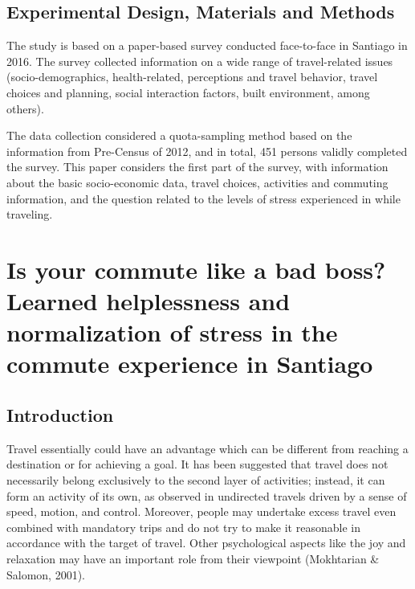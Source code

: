 \documentclass[
11pt, %
oneside, %
english, %
singlespacing, %
]{macthesis} %
\begin{document}
\hypertarget{experimental-design-materials-and-methods}{%
\section{Experimental Design, Materials and Methods}\label{experimental-design-materials-and-methods}}

The study is based on a paper-based survey conducted face-to-face in Santiago in 2016. The survey collected information on a wide range of travel-related issues (socio-demographics, health-related, perceptions and travel behavior, travel choices and planning, social interaction factors, built environment, among others).

The data collection considered a quota-sampling method based on the information from Pre-Census of 2012, and in total, 451 persons validly completed the survey. This paper considers the first part of the survey, with information about the basic socio-economic data, travel choices, activities and commuting information, and the question related to the levels of stress experienced in while traveling.

\hypertarget{is-your-commute-like-a-bad-boss-learned-helplessness-and-normalization-of-stress-in-the-commute-experience-in-santiago}{%
\chapter{Is your commute like a bad boss? Learned helplessness and normalization of stress in the commute experience in Santiago}\label{is-your-commute-like-a-bad-boss-learned-helplessness-and-normalization-of-stress-in-the-commute-experience-in-santiago}}

\hypertarget{introduction-3}{%
\section{Introduction}\label{introduction-3}}

Travel essentially could have an advantage which can be different from reaching a destination or for achieving a goal. It has been suggested that travel does not necessarily belong exclusively to the second layer of activities; instead, it can form an activity of its own, as observed in undirected travels driven by a sense of speed, motion, and control. Moreover, people may undertake excess travel even combined with mandatory trips and do not try to make it reasonable in accordance with the target of travel. Other psychological aspects like the joy and relaxation may have an important role from their viewpoint (Mokhtarian \& Salomon, 2001).
\end{document}
